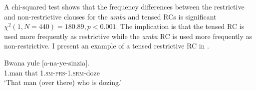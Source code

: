 \documentclass[output=paper,colorlinks,citecolor=brown]{langscibook}
\begin{document}

A chi-squared test shows that the frequency differences between the restrictive and non-restrictive clauses for the \textit{amba} and tensed RCs is significant $\chi^2 (1,\allowbreak N=440) = 180.89, p < 0.001$. The implication is that the tensed RC is used more frequently as restrictive while the \textit{amba} RC is used more frequently as non-restrictive. I present an example of a tensed restrictive RC in .

\ea%
    \label{ex:mwamzandi:14}
    \gll    Bwana yule [a-na-ye-sinzia].\\
            1.man  that  \textsc{1.sm-prs-1.srm-}doze\\
    \glt    ‘That man (over there) who is dozing.’
\z
\end{document}
